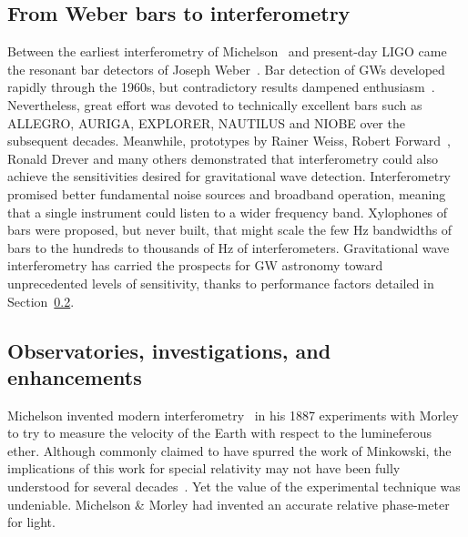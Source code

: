 
        \subsection{From Weber bars to interferometry}
        \label{bars_to_interferometry}

Between the earliest interferometry of Michelson~\cite{michelson} and present-day LIGO came the resonant bar detectors of Joseph Weber~\cite{Weber1960}.
Bar detection of GWs developed rapidly through the 1960s, but contradictory results dampened enthusiasm~\cite{Saulson,CollinsGravityShadow}.
Nevertheless, great effort was devoted to technically excellent bars such as ALLEGRO, AURIGA, EXPLORER, NAUTILUS and NIOBE over the subsequent decades.
Meanwhile, prototypes by Rainer Weiss, Robert Forward~\cite{Forward1978}, Ronald Drever and many others demonstrated that interferometry could also achieve the sensitivities desired for gravitational wave detection.
Interferometry promised better fundamental noise sources and broadband operation, meaning that a single instrument could listen to a wider frequency band.
Xylophones of bars were proposed, but never built, that might scale the few Hz bandwidths of bars to the hundreds to thousands of Hz of interferometers.
Gravitational wave interferometry has carried the prospects for GW astronomy toward unprecedented levels of sensitivity, thanks to performance factors detailed in Section~\ref{methods}.


        \subsection{Observatories, investigations, and enhancements}
        \label{methods}


	Michelson invented modern interferometry~\cite{michelson} in his 1887 experiments with Morley to try to measure the velocity of the Earth with respect to the lumineferous ether.
Although commonly claimed to have spurred the work of Minkowski, the implications of this work for special relativity may not have been fully understood for several decades~\cite{CollinsGravityGhost}.
Yet the value of the experimental technique was undeniable.
Michelson \& Morley had invented an accurate relative phase-meter for light.

